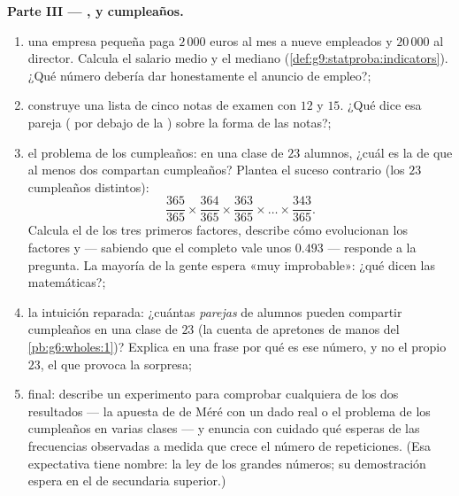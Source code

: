 \begin{problem}
\medskip
\noindent\textbf{Parte III --- ,  y cumpleaños.}
\begin{enumerate}[resume]
  \item una empresa pequeña paga $2\,000$ euros al mes a nueve empleados
        y $20\,000$ al director. Calcula el salario medio y el
        mediano (\cref{def:g9:statproba:indicators}).
        ¿Qué número debería dar honestamente el anuncio de
        empleo?;
  \item construye una lista de cinco notas de examen con  $12$ y
         $15$. ¿Qué dice esa pareja ( por debajo de la )
        sobre la forma de las notas?;
  \item el problema de los cumpleaños: en una clase de $23$ alumnos, ¿cuál
        es la  de que al menos dos compartan cumpleaños?
        Plantea el suceso contrario (los $23$ cumpleaños distintos):
        \[
        \frac{365}{365} \times \frac{364}{365} \times
        \frac{363}{365} \times \dots \times \frac{343}{365} .
        \]
        Calcula el  de los tres primeros factores, describe
        cómo evolucionan los factores y --- sabiendo que el
         completo vale unos $0.493$ --- responde a la pregunta. La mayoría de la
        gente espera «muy improbable»: ¿qué dicen las
        matemáticas?;
  \item la intuición reparada: ¿cuántas \emph{parejas} de
        alumnos pueden compartir cumpleaños en una clase de $23$
        (la cuenta de apretones de manos del \cref{pb:g6:wholes:1})? Explica en una
        frase por qué es ese número, y no el propio $23$, el que provoca
        la sorpresa;
  \item final: describe un experimento para comprobar cualquiera de los dos resultados
        --- la apuesta de de Méré con un dado real o el problema
        de los cumpleaños en varias clases --- y enuncia con cuidado
        qué esperas de las frecuencias observadas a medida que crece el número
        de repeticiones. (Esa expectativa tiene nombre: la
        ley de los grandes números; su demostración espera en el  de
        secundaria superior.)
\end{enumerate}
\end{problem}
